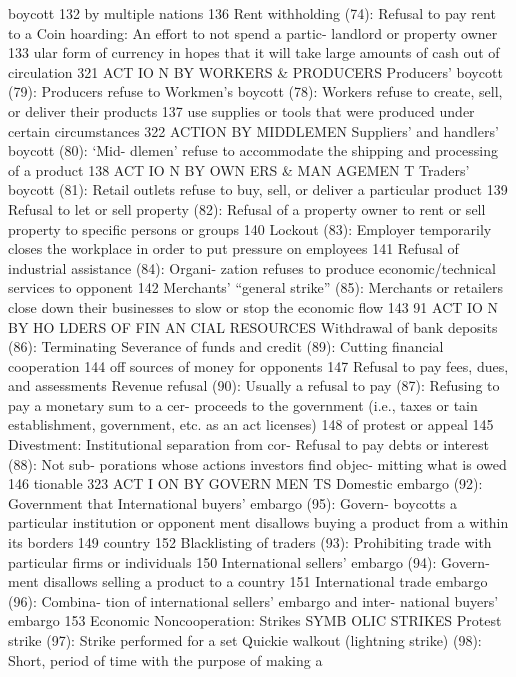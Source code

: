 \documentclass[twoside,a4paper,12pt,fleqn,openany]{extbook}
\begin{document}
boycott
 132
 by multiple nations
 136
Rent withholding (74): Refusal to pay rent to a
 Coin hoarding: An effort to not spend a partic-
landlord or property owner
 133
 ular form of currency in hopes that it will take
large amounts of cash out of circulation 321
ACT IO N BY WORKERS & PRODUCERS
Producers’ boycott (79): Producers refuse to
 Workmen’s boycott (78): Workers refuse to
create, sell, or deliver their products
 137
 use supplies or tools that were produced under
certain circumstances
 322
ACTION BY MIDDLEMEN
Suppliers’ and handlers’ boycott (80): ‘Mid-
dlemen’ refuse to accommodate the shipping
and processing of a product
 138
ACT IO N BY OWN ERS & MAN AGEMEN T
Traders’ boycott (81): Retail outlets refuse to
buy, sell, or deliver a particular product 139
Refusal to let or sell property (82): Refusal of
a property owner to rent or sell property to
specific persons or groups
 140
Lockout (83): Employer temporarily closes
the workplace in order to put pressure on
employees
 141
Refusal of industrial assistance (84): Organi-
zation refuses to produce economic/technical
services to opponent
 142
Merchants’ “general strike” (85): Merchants
or retailers close down their businesses to slow
or stop the economic flow
 143
91
ACT IO N BY HO LDERS OF FIN AN CIAL RESOURCES
Withdrawal of bank deposits (86): Terminating
 Severance of funds and credit (89): Cutting
financial cooperation
 144
 off sources of money for opponents
 147
Refusal to pay fees, dues, and assessments
 Revenue refusal (90): Usually a refusal to pay
(87): Refusing to pay a monetary sum to a cer-
 proceeds to the government (i.e., taxes or
tain establishment, government, etc. as an act
 licenses)
 148
of protest or appeal
 145
Divestment: Institutional separation from cor-
Refusal to pay debts or interest (88): Not sub-
 porations whose actions investors find objec-
mitting what is owed
 146
 tionable
 323
ACT I ON BY GOVERN MEN TS
Domestic embargo (92): Government that
 International buyers’ embargo (95): Govern-
boycotts a particular institution or opponent
 ment disallows buying a product from a
within its borders
 149
 country
 152
Blacklisting of traders (93): Prohibiting trade
with particular firms or individuals
 150
International sellers’ embargo (94): Govern-
ment disallows selling a product to a country		
151
International trade embargo (96): Combina-
tion of international sellers’ embargo and inter-
national buyers’ embargo
 153
Economic Noncooperation: Strikes
SYMB OLIC STRIKES
Protest strike (97): Strike performed for a set
 Quickie walkout (lightning strike) (98): Short,
period of time with the purpose of making a
\end{document}
